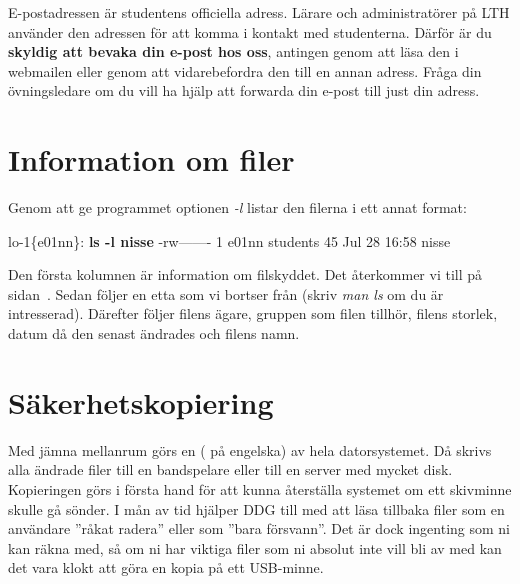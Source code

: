 \documentclass[a4paper,twocolumn]{book}
\begin{document}
E-postadressen är studentens officiella adress. Lärare och administratörer
på LTH använder den adressen för att komma i kontakt med studenterna.
Därför är du \textbf{skyldig att bevaka din e-post hos oss}, antingen
genom att läsa den i webmailen eller genom att vidarebefordra den till en
annan adress. Fråga din övningsledare om du vill ha hjälp att forwarda din e-post till just din adress.

%

\section{Information om filer}

Genom att ge programmet  optionen
\emph{-l} listar den filerna i ett annat format:
\begin{example}
  \scriptsize
  lo-1\{e01nn\}: \textbf{ls -l nisse}
  -rw-------   1 e01nn  students  45  Jul 28 16:58 nisse
\end{example}
Den första kolumnen är information om filskyddet. Det återkommer vi
till på sidan~\pageref{sec:filskydd}. Sedan följer en etta som vi
bortser från (skriv \emph{man ls} om du är intresserad). Därefter
följer filens ägare, gruppen som filen tillhör, filens storlek, datum
då den senast ändrades och filens namn.

\section{Säkerhetskopiering}

Med jämna mellanrum görs en 
( på engelska) av hela datorsystemet. Då skrivs alla
ändrade filer till en bandspelare eller till en server med mycket disk.
Kopieringen görs i första hand för
att kunna återställa systemet om ett skivminne skulle gå sönder. I mån
av tid hjälper DDG till med att läsa tillbaka filer som en användare
''råkat radera'' eller som ''bara försvann''. Det är dock ingenting
som ni kan räkna med, så om ni har viktiga filer som ni absolut inte
vill bli av med kan det vara klokt att göra en kopia på ett USB-minne.
\end{document}

